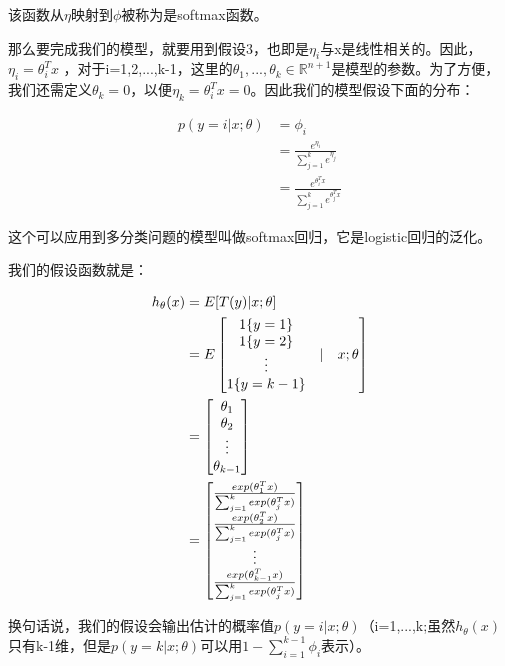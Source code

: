 \documentclass[UTF8]{ctexart}
\begin{document}
该函数从$\eta$映射到$\phi$被称为是softmax函数。

那么要完成我们的模型，就要用到假设3，也即是$\eta_{i}$与x是线性相关的。因此，$\eta_{i}= \theta_{i}^{T}x$ ，对于i=1,2,...,k-1，这里的$\theta_{1},...,\theta_{k}\in \mathbb{R}^{n+1}$是模型的参数。为了方便，我们还需定义$\theta_{k}=0$，以便$\eta_{k}= \theta_{i}^{T}x = 0$。因此我们的模型假设下面的分布：

\begin{align*}
p(y=i|x;\theta) & = \phi_{i} \\
& = \frac{e^{\eta_{i}} }{\sum_{j=1}^{k} e^{\eta_{j}}}\\
& = \frac{e^{\theta_{i}^{T}x} }{ \sum_{j=1}^{k}  e^{\theta_{j}^{T}x}}
\end{align*} 


这个可以应用到多分类问题的模型叫做softmax回归，它是logistic回归的泛化。

我们的假设函数就是：

\begin{align*}
h_{\theta}(x) & = E[T(y)|x;\theta] \\
& = E   \begin{bmatrix} 
			\begin{matrix}
			1\{y=1\} \\
			1\{y=2\} \\
			\vdots \\
			1\{y=k-1\}
			\end{matrix}	& 
			\arrowvert &
			x;\theta
    	\end{bmatrix} \\
& = \begin{bmatrix} 
\theta_{1} \\
\theta_{2} \\
\vdots \\
\theta_{k-1} 
\end{bmatrix} \\
& = \begin{bmatrix} 
	\frac{exp(\theta_{1}^{T}x)}{\sum_{j=1}^{k}exp(\theta_{j}^{T}x)} \\
	\frac{exp(\theta_{2}^{T}x)}{\sum_{j=1}^{k}exp(\theta_{j}^{T}x)}\\
	\vdots \\
	\frac{exp(\theta_{k-1}^{T}x)}{\sum_{j=1}^{k}exp(\theta_{j}^{T}x) }\end{bmatrix} 
\end{align*}

换句话说，我们的假设会输出估计的概率值$p(y=i|x;\theta)$（i=1,...,k;虽然$h_{\theta}(x)$  只有k-1维，但是$p(y=k|x;\theta)$可以用$1-\sum_{i=1}^{k-1}\phi_{i}$表示）。
\end{document}
